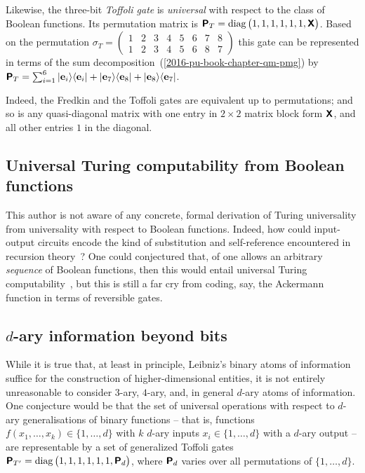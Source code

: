 Likewise, the three-bit
{\em Toffoli gate}
is {\em universal} with respect to the class of
Boolean functions.
Its permutation matrix is
$\textsf{\textbf{P}}_T = \textrm{diag}\begin{pmatrix}1,1,1,1,1,1,\textsf{\textbf{X}}\end{pmatrix}$.
Based on the permutation $\sigma_T =  \begin{pmatrix}1&2&3&4&5&6&7&8 \\ 1&2&3&4&5&6&8&7\end{pmatrix}$
this gate can be represented in terms of the sum decomposition~(\ref{2016-pu-book-chapter-qm-pmg})
by $\textsf{\textbf{P}}_T =
\sum_{i=1}^6 \vert {\bf e}_i \rangle \langle {\bf e}_i \vert +
\vert {\bf e}_7 \rangle \langle {\bf e}_8 \vert +
\vert {\bf e}_8 \rangle \langle {\bf e}_7 \vert
$.

Indeed, the Fredkin and the Toffoli gates are equivalent up to permutations;
and so is any quasi-diagonal matrix with one entry in  $2\times 2$ matrix block form $\textsf{\textbf{X}}$, and all other entries $1$ in the diagonal.

\subsection{Universal Turing computability from Boolean functions}

This author is not aware of any concrete, formal derivation of Turing universality from universality with respect to Boolean functions.
Indeed, how could input-output circuits encode the kind of substitution and self-reference encountered in recursion theory~\cite{smullyan-92,Smullyan1993-SMURTF,book:486992}?
One could conjectured that, of one allows an arbitrary {\em sequence} of Boolean functions, then this would entail
universal Turing computability~\cite{Borodin-1977,Nishimura-2009}, but this is still a far cry from coding, say, the
Ackermann function
in terms of reversible gates.


\subsection{$d$-ary information beyond bits}

While it is true that, at least in principle, Leibniz's binary atoms of information suffice for the construction of higher-dimensional entities,
it is not entirely unreasonable to consider $3$-ary, $4$-ary, and, in general $d$-ary atoms of information.
One conjecture would be that the set of universal operations with respect to $d$-ary generalisations of binary functions --
that is, functions $f(x_1,\ldots ,x_k) \in \{ 1 ,\ldots , d \}$ with $k$ $d$-ary inputs $x_i \in \{ 1 ,\ldots , d \}$
with a $d$-ary output --
are representable by a set of generalized Toffoli gates
$\textsf{\textbf{P}}_{T'} = \textrm{diag}\begin{pmatrix}1,1,1,1,1,1,\textsf{\textbf{P}}_d\end{pmatrix}$,
where $\textsf{\textbf{P}}_d$ varies over all permutations of $\{1, \ldots ,d\}$.


